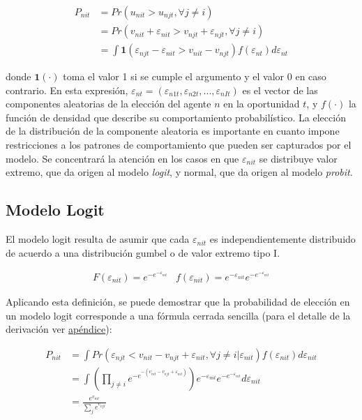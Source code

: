 \documentclass[
]{book}
\begin{document}
\[
\begin{aligned}
P_{nit} &= Pr(u_{nit}>u_{njt},\forall j \neq i)\\
&= Pr(v_{nit} + \varepsilon_{nit} >v_{njt} + \varepsilon_{njt} ,\forall j \neq i)\\
&= \int \textbf{1} (\varepsilon_{njt} - \varepsilon_{nit} > v_{nit} - v_{njt}) f(\varepsilon_{nt}) d \varepsilon_{nt}
\end{aligned}
\]

donde \(\textbf{1}(\cdot)\) toma el valor 1 si se cumple el argumento y el valor 0 en caso contrario. En esta expresión, \(\varepsilon_{nt} = (\varepsilon_{n1t},\varepsilon_{n2t}, ...,\varepsilon_{nIt})\) es el vector de las componentes aleatorias de la elección del agente \(n\) en la oportunidad \(t\), y \(f(·)\) la función de densidad que describe su comportamiento probabilístico. La elección de la distribución de la componente aleatoria es importante en cuanto impone restricciones a los patrones de comportamiento que pueden ser capturados por el modelo. Se concentrará la atención en los casos en que \(\varepsilon_{nit}\) se distribuye valor extremo, que da origen al modelo \emph{logit}, y normal, que da origen al modelo \emph{probit}.

\subsection{Modelo Logit}\label{modelo-logit}

El modelo logit resulta de asumir que cada \(\varepsilon_{nit}\) es independientemente distribuido de acuerdo a una distribución gumbel o de valor extremo tipo I.

\begin{equation} 
  \begin{array}{cc}
  F(\varepsilon_{nit}) = e^{-e^{-\varepsilon_{nit}}}
   &f(\varepsilon_{nit}) = e^{-\varepsilon_{nit}}e^{-e^{-\varepsilon_{nit}}}
   \end{array}
  \label{eq:logituno}
\end{equation}

Aplicando esta definición, se puede demostrar que la probabilidad de elección en un modelo logit corresponde a una fórmula cerrada sencilla (para el detalle de la derivación ver \hyperref[apuxe9ndice]{apéndice}):

\begin{equation}
\begin{aligned}
P_{nit} &= \int Pr(\varepsilon_{njt} < v_{nit} - v_{njt} + \varepsilon_{nit}, \forall j \neq i | \varepsilon_{nit}) f(\varepsilon_{nit})d\varepsilon_{nit}\\
&= \int \left(\prod_{j \neq i} e^{-e^{-(v_{nit} - v_{njt} + \varepsilon_{nit})}}\right) e^{-\varepsilon_{nit}}e^{-e^{-\varepsilon_{nit}}}d \varepsilon_{nit} \\
&= \frac{e^{v_{nit}}}{\sum_j e^{v_{njt}}}
\end{aligned}
\label{eq:logitprob}
\end{equation}
\end{document}

